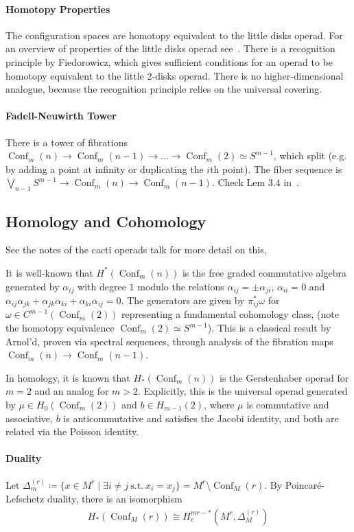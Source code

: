 \documentclass{scrartcl}
\theoremstyle{plain}
\theoremstyle{definition}
\newcommand{\iso}{\cong}
\newcommand{\defeq}{\coloneqq}
\DeclareMathOperator{\Conf}{Conf}
\begin{document}
\paragraph{Homotopy Properties} The configuration spaces are homotopy equivalent to the little disks operad. For an overview of properties of the little disks operad see~\cite{fresse2017homotopy}. There is a recognition principle by Fiedorowicz, which gives sufficient conditions for an operad to be homotopy equivalent to the little 2-disks operad. There is no higher-dimensional analogue, because the recognition principle relies on the universal covering. 

\paragraph{Fadell-Neuwirth Tower} There is a tower of fibrations $\Conf_m(n) \to \Conf_m(n-1) \to \dots \to \Conf_m(2) \simeq S^{m-1}$, which split (e.g. by adding a point at infinity or duplicating the $i$th point). The fiber sequence is $\bigvee_{n-1} S^{m-1} \to \Conf_m(n) \to \Conf_m(n-1)$. Check Lem 3.4 in~\cite{sinha2010homology}. 

\subsection{Homology and Cohomology} 
See the notes of the cacti operads talk for more detail on this, 

It is well-known that $H^*(\Conf_m(n))$ is the free graded commutative algebra generated by $\alpha_{ij}$ with degree $1$ modulo the relations $\alpha_{ij} = \pm\alpha_{ji}$, $\alpha_{ii}=0$ and $\alpha_{ij}\alpha_{jk} + \alpha_{jk}\alpha_{ki} + \alpha_{ki}\alpha_{ij} = 0$. The generators are given by $\pi_{ij}^*\omega$ for $\omega\in C^{m-1}(\Conf_m(2))$ representing a fundamental cohomology class, (note the homotopy equivalence $\Conf_m(2)\simeq S^{m-1}$). This is a classical result by Arnol'd, proven via spectral sequences, through analysis of the fibration maps $\Conf_m(n) \to \Conf_m(n-1)$. 

In homology, it is known that $H_*(\Conf_m(n))$ is the Gerstenhaber operad for $m=2$ and an analog for $m>2$. Explicitly, this is the universal operad generated by $\mu\in H_0(\Conf_m(2))$ and $b\in H_{m-1}(2)$, where $\mu$ is commutative and associative, $b$ is anticommutative and satisfies the Jacobi identity, and both are related via the Poisson identity. 

\paragraph{Duality}
Let $\Delta_m^{(r)} \defeq \{x\in M^r \mid \exists i\neq j \ \text{s.t.}\ x_i = x_j\} = M^r\setminus \Conf_M(r)$. By Poincaré-Lefschetz duality, there is an isomorphism 
\begin{align*}
    H_*(\Conf_M(r)) \iso H_c^{mr- *}(M^r, \Delta^{(r)}_M)
\end{align*}
\end{document}
